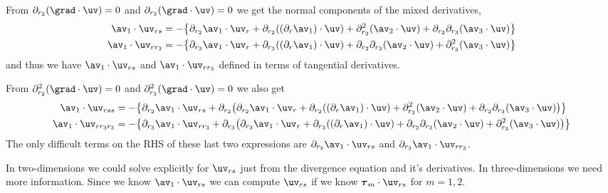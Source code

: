 From $\prb(\grad\cdot\uv)=0$ and $\prc(\grad\cdot\uv)=0$ we get the normal components of the
mixed derivatives,
\begin{align*}
  \av_1\cdot\uv_{rs} &= -\big\{ \prb\av_1\cdot\uv_r + \prb( (\partial_r\av_1)\cdot\uv )
                + \prb^2(\av_2\cdot\uv)+\prb\prc(\av_3\cdot\uv)\big\} \\
  \av_1\cdot\uv_{r\rc} &= -\big\{ \prc\av_1\cdot\uv_r + \prc( (\partial_r\av_1)\cdot\uv )
               + \prb\prc(\av_2\cdot\uv)+\prc^2(\av_3\cdot\uv)\big\} \\
\end{align*}
and thus we have $\av_1\cdot\uv_{rs}$ and $\av_1\cdot\uv_{r\rc}$ defined in terms of tangential derivatives.

From $\prb^2(\grad\cdot\uv)=0$ and $\prc^2(\grad\cdot\uv)=0$ we also get 
\begin{align*}
  \av_1\cdot\uv_{rss} &= -\big\{ \prb\av_1\cdot\uv_{rs} +
            \prb\big( \prb\av_1\cdot\uv_r + \prb( (\partial_r\av_1)\cdot\uv )
                  + \prb^2(\av_2\cdot\uv)+\prb\prc(\av_3\cdot\uv) \big) \big\} \\
  \av_1\cdot\uv_{r\rc\rc} &= -\big\{ \prc\av_1\cdot\uv_{r\rc} +
                \prc\big(  \prc\av_1\cdot\uv_r + \prc( (\partial_r\av_1)\cdot\uv )
                   + \prb\prc(\av_2\cdot\uv)+\prc^2(\av_3\cdot\uv) \big) \big\} \\
\end{align*}
The only difficult terms on the RHS of these
 last two expressions are $\prb\av_1\cdot\uv_{rs}$ and $\prc\av_1\cdot\uv_{r\rc}$.

In two-dimensions we could solve explicitly for $\uv_{rs}$ just from the divergence equation and it's derivatives.
In three-dimensions we need more information. Since we know $\av_1\cdot\uv_{rs}$ we can compute
$\uv_{rs}$ if we know $\tauv_m\cdot\uv_{rs}$ for $m=1,2$.

